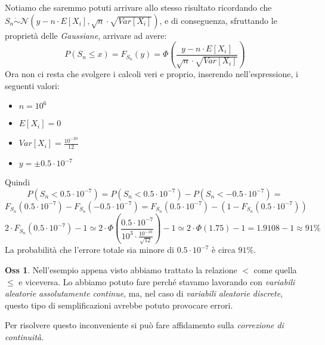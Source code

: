 \documentclass[12pt, a4paper]{report}
\theoremstyle{definition}
\newtheorem*{observation}{Oss}
\DeclareRobustCommand{\norm}{\mathcal{N}}
\begin{document}
Notiamo che saremmo potuti arrivare allo stesso risultato ricordando che \(S_n
\dot{\sim}\norm(y-n\cdot E[X_i], \sqrt{n}\cdot \sqrt{Var[X_i]})\), e di conseguenza,
sfruttando le proprietà delle \emph{Gaussiane}, arrivare ad avere:
\[P(S_n\leq x)=F_{S_n}(y)=\Phi\left(\frac{y-n\cdot E[X_i]}{\sqrt{n}\cdot \sqrt{Var[X_i]}}\right)\]
Ora non ci resta che svolgere i calcoli veri e proprio, inserendo nell'espressione,
i seguenti valori:
\begin{itemize}
	\item $n=10^6$
	\item $E[X_i]=0$
	\item $Var[X_i]=\frac{10^{-20}}{12}$
	\item $y=\pm 0.5\cdot 10^{-7}$
\end{itemize}
Quindi
\[P(S_n<0.5\cdot 10^{-7})=P(S_n<0.5\cdot 10^{-7})-P(S_n<-0.5\cdot 10^{-7})=\]
\[F_{S_n}(0.5\cdot 10^{-7})-F_{S_n}(-0.5\cdot 10^{-7})=F_{S_n}(0.5\cdot 10^{-7})-(1-F_{S_n}(0.5\cdot 10^{-7}))\]
\[2\cdot F_{S_n}(0.5\cdot 10^{-7})-1\simeq2\cdot \Phi\left(\frac{0.5\cdot 10^{-7}}{10^3\cdot \frac{10^{-10}}
{\sqrt{12}}}\right)-1\simeq2\cdot \Phi(1.75)-1=1.9108-1\approx91\%\]
La probabilità che l'errore totale sia minore di $0.5\cdot 10^{-7}$ è circa $91\%$.

\begin{observation}
	Nell'esempio appena visto abbiamo trattato la relazione $<$ come quella $\leq$
	e viceversa. Lo abbiamo potuto fare perché stavamo lavorando con \emph{variabili
	aleatorie assolutamente continue}, ma, nel caso di \emph{variabili aleatorie
	discrete}, questo tipo di semplificazioni avrebbe potuto provocare errori.

	Per risolvere questo inconveniente si può fare affidamento sulla
	\emph{correzione di continuità}.
\end{observation}
\end{document}
